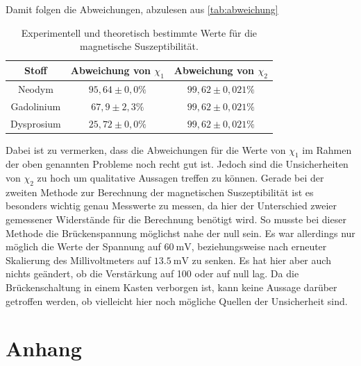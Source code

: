 Damit folgen die Abweichungen, abzulesen aus \autoref{tab:abweichung}
\begin{table}[H]
    \centering
    \caption{Experimentell und theoretisch bestimmte Werte für die magnetische Suszeptibilität.}
    \label{tab:abweichung}
    \begin{tabular}{c| c c}
        \toprule
        Stoff & Abweichung von $\chi_1$ & Abweichung von $\chi_2$ \\
        \midrule
        Neodym &  $95,64 \pm 0,0 \%$ & $99,62 \pm 0,021 \%$ \\
        Gadolinium & $67,9 \pm 2,3 \%$ & $99,62 \pm 0,021 \%$ \\
        Dysprosium & $25,72 \pm 0,0\%$ & $99,62 \pm 0,021 \%$ \\
      \bottomrule
    \end{tabular}
\end{table}


\noindent
Dabei ist zu vermerken, dass die Abweichungen für die Werte von $\chi_1$ im Rahmen der oben genannten Probleme noch recht gut ist. Jedoch sind die Unsicherheiten von $\chi_2$ zu hoch um qualitative Aussagen treffen zu können.
Gerade bei der zweiten Methode zur Berechnung der magnetischen Suszeptibilität ist es besonders wichtig genau Messwerte zu messen, da hier der Unterschied zweier gemessener Widerstände für die Berechnung benötigt wird. So musste bei dieser Methode
die Brückenspannung möglichst nahe der null sein. Es war allerdings nur möglich die Werte der Spannung auf $\SI{60}{\milli\volt}$, beziehungsweise nach erneuter Skalierung des Millivoltmeters auf
$\SI{13,5}{\milli\volt}$ zu senken. Es hat hier aber auch nichts geändert, ob die Verstärkung auf 100 oder auf null lag.
Da die Brückenschaltung in einem Kasten verborgen ist, kann keine Aussage darüber getroffen werden, ob vielleicht hier noch mögliche Quellen der Unsicherheit sind.


\section{Anhang}
\label{sec:Anhang}

